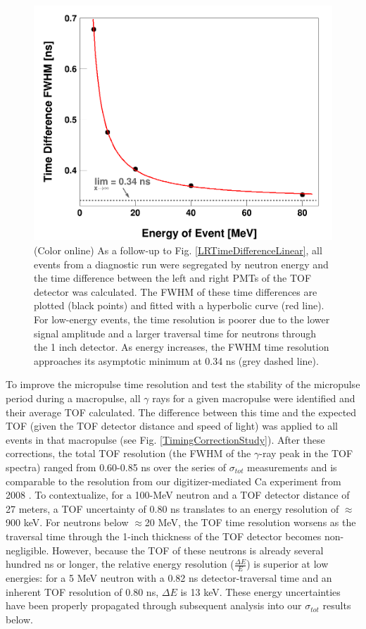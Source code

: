 \documentclass[twocolumn,secnumarabic,amssymb, nobibnotes, aps, prl,
superscriptaddress, nobalancelastpage]{revtex4}
\newcommand{\tots}{\ensuremath{\sigma_{tot}}\,\,}
\begin{document}
\begin{figure}
    \includegraphics[scale=0.3]{figures/DifferenceThresholdsFit.png}
    \caption{(Color online) As a follow-up to Fig. \ref{LRTimeDifferenceLinear},
        all events from a diagnostic run were segregated by neutron energy and the
        time difference between the left and right PMTs of the TOF detector
        was calculated. The FWHM of these time differences are plotted (black
        points) and fitted with a hyperbolic curve (red line). For low-energy
        events, the time resolution is poorer due to the lower signal amplitude and
        a larger traversal time for neutrons through the 1 inch detector. As energy
        increases, the FWHM time resolution approaches its asymptotic minimum at 0.34
    ns (grey dashed line).}
    \label{DifferenceThresholdsFit}
\end{figure}

To improve the micropulse time resolution and test the stability of the
micropulse period during a macropulse, all $\gamma$ rays for a given macropulse
were identified and their average TOF calculated. The difference between this
time and the expected TOF (given the TOF detector distance and speed of light)
was applied to all events in that macropulse (see Fig.
\ref{TimingCorrectionStudy}). After these corrections, the total TOF resolution
(the FWHM of the $\gamma$-ray peak in the TOF spectra) ranged from
0.60-0.85 ns over the series of \tots measurements and is comparable to the resolution from 
our digitizer-mediated Ca experiment from 2008 \cite{Shane2010}.
To contextualize, for a 100-MeV neutron and a TOF detector distance of 27 meters, a TOF 
uncertainty of 0.80 ns translates to an energy resolution of $\approx$900 keV.
For neutrons below $\approx$20 MeV, the TOF time resolution worsens as the traversal time 
through the 1-inch thickness of the TOF detector becomes non-negligible.
However, because the TOF of these neutrons is already several hundred ns or
longer, the relative energy resolution ($\frac{\Delta E}{E}$) is
superior at low energies: for a 5 MeV neutron with a 0.82 ns detector-traversal time and
an inherent TOF resolution of 0.80 ns, $\Delta E$ is 13 keV. These energy uncertainties
have been properly propagated through subsequent analysis into our \tots results below.
\end{document}
